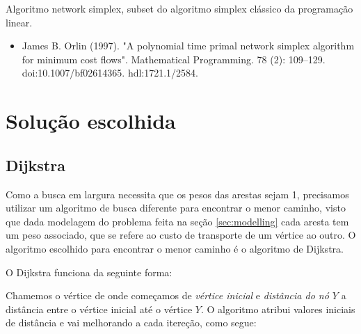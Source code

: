 \documentclass[12pt, a4]{article}
\begin{document}
Algoritmo network simplex, subset do algoritmo simplex clássico da programação
linear.

\begin{itemize}
\item James B. Orlin (1997). "A polynomial time primal network simplex algorithm
    for minimum cost flows". Mathematical Programming. 78 (2): 109–129.
    doi:10.1007/bf02614365. hdl:1721.1/2584.
\end{itemize}

\section{Solução escolhida}
\label{sec:solution}

\subsection{Dijkstra}
\label{subsec:dijkstra}

Como a busca em largura necessita que os pesos das arestas sejam 1, precisamos
utilizar um algoritmo de busca diferente para encontrar o menor caminho, visto
que dada modelagem do problema feita na seção \ref{sec:modelling} cada aresta
tem um peso associado, que se refere ao custo de transporte de um vértice ao
outro. O algoritmo escolhido para encontrar o menor caminho é o algoritmo de
Dijkstra.

O Dijkstra funciona da seguinte forma:

Chamemos o vértice de onde começamos de \emph{vértice inicial} e \emph{distância
    do nó $Y$} a distância entre o vértice inicial até o vértice $Y$. O
algoritmo atribui valores iniciais de distância e vai melhorando a cada
itereção, como segue:
\end{document}
